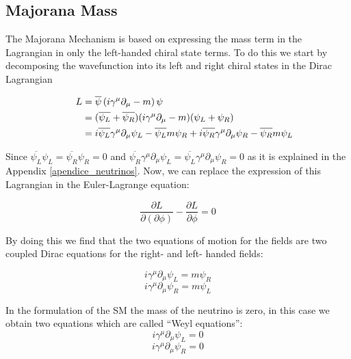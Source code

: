 \subsection{Majorana Mass}

The Majorana Mechanism is based on expressing the mass term in the Lagrangian in only the left-handed chiral state terms.
To do this we start by decomposing the wavefunction into its left and right chiral states in the Dirac Lagrangian \cite{Theory_neutrinos_book} 


\begin{align}
  \phantom{i = j = k}
  &\begin{aligned}
    \mathllap{L} &= \overline{\psi} \left( i \gamma ^\mu \partial_{\mu} - m \right) \psi \\
    \mathllap{}  &= (\overline{\psi_L} + \overline{\psi_R})( i \gamma ^\mu \partial_{\mu} - m)(\psi_L + \psi_R) \\
     \mathllap{} &= i \overline{\psi_L}\gamma^\mu\partial_\mu \psi_L - \overline{\psi_L} m \psi_R +
     i\overline{\psi_R}\gamma^\mu \partial_\mu \psi_R - \overline{\psi_R}m\psi_L
   &\end{aligned}
\end{align}

Since $\overline{\psi_L}\psi_L = \overline{\psi_R}\psi_R = 0$ and $\overline{\psi_R}\gamma^\mu \partial_\mu \psi_L = \overline{\psi_L}\gamma^\mu\partial_\mu \psi_R = 0$
as it is explained in the Appendix \ref{apendice_neutrinos}. Now, we can replace the expression of this Lagrangian in the Euler-Lagrange equation:

\begin{equation}
\frac{\partial L}{\partial (\partial \phi)} - \frac{\partial L}{\partial \phi} = 0
\end{equation}

By doing this we find that the two equations of motion for the fields are two coupled Dirac equations for the right- and left- handed fields:

\begin{equation}\label{majorana_objetive}
i \gamma ^\mu \partial_\mu \psi_L = m \psi_R
\end{equation} 
\begin{equation}\label{majorana_start}
i \gamma ^\mu \partial_\mu \psi_R = m \psi_L
\end{equation} 

In the formulation of the SM the mass of the neutrino is zero, in this case we obtain two equations which are called ``Weyl equations'':
\begin{equation}
i \gamma ^\mu \partial_\mu \psi_L = 0
\end{equation}
\begin{equation}
i \gamma ^\mu \partial_\mu \psi_R = 0
\end{equation}

